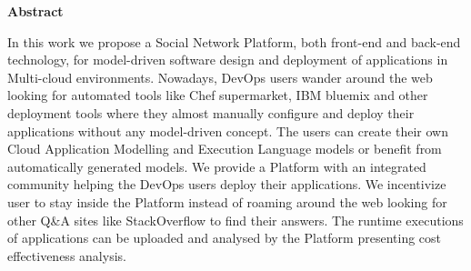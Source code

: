 \thispagestyle{empty}
\begin{titlepage}
\begin{center}
{\bf\Large Abstract}\\
\end{center}

\indent In this work we propose a Social Network Platform, both front-end and back-end technology, for model-driven software design and deployment of applications in Multi-cloud environments. Nowadays, DevOps users wander around the web looking for automated tools like Chef supermarket, IBM bluemix and other deployment tools where they almost manually configure and deploy their applications without any model-driven concept. The users can create their own Cloud Application Modelling and Execution
Language models or benefit from automatically generated models. We provide a Platform with an integrated community helping the DevOps users deploy their applications. We incentivize user to stay inside the Platform instead of roaming around the web looking for other Q\&A sites like StackOverflow to find their answers. The runtime executions of applications can be uploaded and analysed by the Platform presenting cost effectiveness analysis.


\vfill
\end{titlepage}

